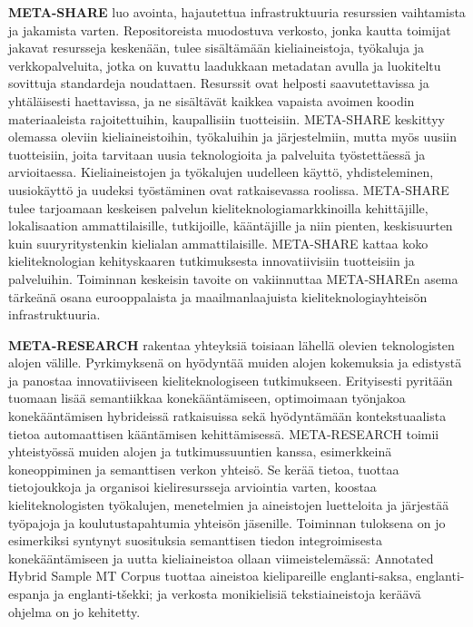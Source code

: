 \documentclass[]{../../metanetpaper}
\begin{document}
\begin{Parallel}[c]{70mm}{70mm}
{\textbf{META-SHARE} luo avointa, hajautettua infrastruktuuria
resurssien vaihtamista ja jakamista varten. Repositoreista muodostuva
verkosto, jonka kautta toimijat jakavat resursseja keskenään, tulee
sisältämään kieliaineistoja, työkaluja ja verkkopalveluita, jotka on
kuvattu laadukkaan metadatan avulla ja luokiteltu sovittuja
standardeja noudattaen. Resurssit ovat helposti saavutettavissa ja
yhtäläisesti haettavissa, ja ne sisältävät kaikkea vapaista avoimen
koodin materiaaleista rajoitettuihin, kaupallisiin
tuotteisiin. META-SHARE keskittyy olemassa oleviin kieliaineistoihin,
työkaluihin ja järjestelmiin, mutta myös uusiin tuotteisiin, joita
tarvitaan uusia teknologioita ja palveluita työstettäessä ja
arvioitaessa. Kieliaineistojen ja työkalujen uudelleen käyttö,
yhdisteleminen, uusiokäyttö ja uudeksi työstäminen ovat ratkaisevassa
roolissa.  META-SHARE tulee tarjoamaan keskeisen palvelun
kieliteknologiamarkkinoilla kehittäjille, lokalisaation
ammattilaisille, tutkijoille, kääntäjille ja niin pienten,
keskisuurten kuin suuryritystenkin kielialan ammattilaisille.
META-SHARE kattaa koko kieliteknologian kehityskaaren tutkimuksesta
innovatiivisiin tuotteisiin ja palveluihin. Toiminnan keskeisin
tavoite on vakiinnuttaa META-SHAREn asema tärkeänä osana
eurooppalaista ja maailmanlaajuista kieliteknologiayhteisön
infrastruktuuria.

\textbf{META-RESEARCH} rakentaa yhteyksiä toisiaan lähellä olevien
teknologisten alojen välille. Pyrkimyksenä on hyödyntää muiden alojen
kokemuksia ja edistystä ja panostaa innovatiiviseen kieliteknologiseen
tutkimukseen. Erityisesti pyritään tuomaan lisää semantiikkaa
konekääntämiseen, optimoimaan työnjakoa konekääntämisen hybrideissä
ratkaisuissa sekä hyödyntämään kontekstuaalista tietoa automaattisen
kääntämisen kehittämisessä. META-RESEARCH toimii yhteistyössä muiden
alojen ja tutkimussuuntien kanssa, esimerkkeinä koneoppiminen ja
semanttisen verkon yhteisö. Se kerää tietoa, tuottaa tietojoukkoja ja
organisoi kieliresursseja arviointia varten, koostaa
kieliteknologisten työkalujen, menetelmien ja aineistojen luetteloita
ja järjestää työpajoja ja koulutustapahtumia yhteisön
jäsenille. Toiminnan tuloksena on jo esimerkiksi syntynyt suosituksia
semanttisen tiedon integroimisesta konekääntämiseen ja uutta
kieliaineistoa ollaan viimeistelemässä: Annotated Hybrid Sample MT
Corpus tuottaa aineistoa kielipareille englanti-saksa,
englanti-espanja ja englanti-tšekki; ja verkosta monikielisiä
tekstiaineistoja keräävä ohjelma on jo kehitetty.
}

\end{Parallel}
\end{document}
